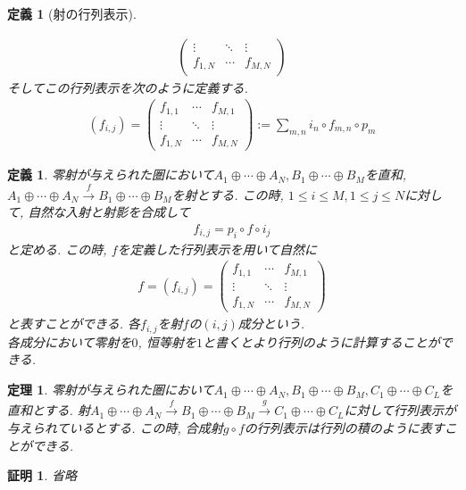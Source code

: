\documentclass[a4paper,12pt]{ltjsarticle}
\theoremstyle{break}
\newtheorem{defn}[thm]{定義}
\newtheorem{thrm}[thm]{定理}
\newtheorem*{prf}{証明}
\newcommand{\xr}[1]{\xrightarrow{#1}}
\newcommand{\ci}{\circ}
\newcommand{\opl}{\oplus}
\numberwithin{equation}{section}
\begin{document}
\begin{defn}[射の行列表示]
\begin{itemize}
\begin{align*}
\begin{pmatrix}
        \vdots & \ddots & \vdots \\
        f_{1,N} & \cdots  & f_{M,N}
      \end{pmatrix}
    \end{align*}
    そしてこの行列表示を次のように定義する. 
    \begin{align*}
      (f_{i,j}) = 
      \begin{pmatrix}
        f_{1,1} & \cdots & f_{M,1} \\
        \vdots & \ddots & \vdots \\
        f_{1,N} & \cdots  & f_{M,N}
      \end{pmatrix}
      := \sum_{m,n} i_n \ci f_{m,n} \ci p_m
    \end{align*}
  \end{itemize}
\end{defn}

\begin{defn}
  零射が与えられた圏において$A_1 \opl \cdots \opl A_N, B_1 \opl \cdots \opl B_M$を直和, $A_1 \opl \cdots \opl A_N \xr{f} B_1 \opl \cdots \opl B_M$を射とする. 
  この時, $1 \leq i \leq M, 1 \leq j \leq N$に対して, 自然な入射と射影を合成して
  \begin{align*}
    f_{i,j}=p_i \ci f \ci i_j
  \end{align*}
  と定める.
  この時, $f$を定義した行列表示を用いて自然に
  \begin{align*}
    f=(f_{i,j})
    =\begin{pmatrix}
      f_{1,1} & \cdots & f_{M,1} \\
      \vdots & \ddots & \vdots \\
      f_{1,N} & \cdots  & f_{M,N}
    \end{pmatrix}
  \end{align*}
  と表すことができる. 
  各$f_{i,j}$を射$f$の$(i,j)$成分という. \\
  各成分において零射を$0$, 恒等射を$1$と書くとより行列のように計算することができる. 
\end{defn}

\begin{thrm}
  零射が与えられた圏において$A_1 \opl \cdots \opl A_N, B_1 \opl \cdots \opl B_M, C_1 \opl \cdots \opl C_L$を直和とする. 
  射$A_1 \opl \cdots \opl A_N \xr{f} B_1 \opl \cdots \opl B_M \xr{g} C_1 \opl \cdots \opl C_L$に対して行列表示が与えられているとする. 
  この時, 合成射$g \ci f$の行列表示は行列の積のように表すことができる. 
\end{thrm}

\begin{prf}
  省略
\end{prf}
\end{document}
